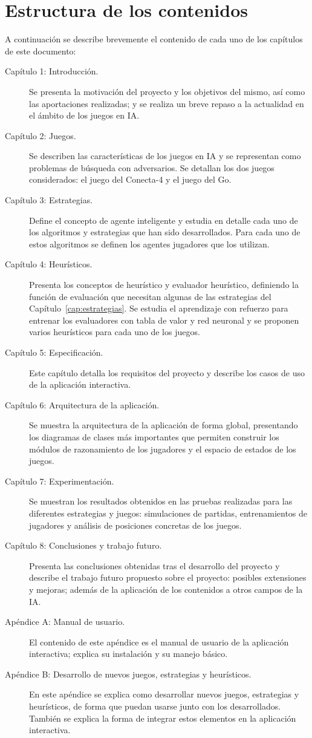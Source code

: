 \section{Estructura de los contenidos}
\label{sec:estructura_contenidos}
A continuación se describe brevemente el contenido de cada uno de los capítulos de este documento:
\begin{description}
	\item[Capítulo 1: Introducción.] Se presenta la motivación del proyecto y los objetivos del mismo, así como las aportaciones realizadas; y se realiza un breve repaso a la actualidad en el ámbito de los juegos en IA.
	\item[Capítulo 2: Juegos.] Se describen las características de los juegos en IA y se representan como problemas de búsqueda con adversarios. Se detallan los dos juegos considerados: el juego del Conecta-4 y el juego del Go.
	\item[Capítulo 3: Estrategias.] Define el concepto de agente inteligente y estudia en detalle cada uno de los algoritmos y estrategias que han sido desarrollados. Para cada uno de estos algoritmos se definen los agentes jugadores que los utilizan.
	\item[Capítulo 4: Heurísticos.] Presenta los conceptos de heurístico y evaluador heurístico, definiendo la función de evaluación que necesitan algunas de las estrategias del Capítulo~\ref{cap:estrategias}. Se estudia el aprendizaje con refuerzo para entrenar los evaluadores con tabla de valor y red neuronal y se proponen varios heurísticos para cada uno de los juegos.
	\item[Capítulo 5: Especificación.] Este capítulo detalla los requisitos del proyecto y describe los casos de uso de la aplicación interactiva.
	\item[Capítulo 6: Arquitectura de la aplicación.] Se muestra la arquitectura de la aplicación de forma global, presentando los diagramas de clases más importantes que permiten construir los módulos de razonamiento de los jugadores y el espacio de estados de los juegos. 
	\item[Capítulo 7: Experimentación.] Se muestran los resultados obtenidos en las pruebas realizadas para las diferentes estrategias y juegos: simulaciones de partidas, entrenamientos de jugadores y análisis de posiciones concretas de los juegos.
	\item[Capítulo 8: Conclusiones y trabajo futuro.] Presenta las conclusiones obtenidas tras el desarrollo del proyecto y describe el trabajo futuro propuesto sobre el proyecto: posibles extensiones y mejoras; además de la aplicación de los contenidos a otros campos de la IA.
	\item[Apéndice A: Manual de usuario.] El contenido de este apéndice es el manual de usuario de la aplicación interactiva; explica su instalación y su manejo básico.	
	\item[Apéndice B: Desarrollo de nuevos juegos, estrategias y heurísticos.] En este apéndice se explica como desarrollar nuevos juegos, estrategias y heurísticos, de forma que puedan usarse junto con los desarrollados. También se explica la forma de integrar estos elementos en la aplicación interactiva.
\end{description}
